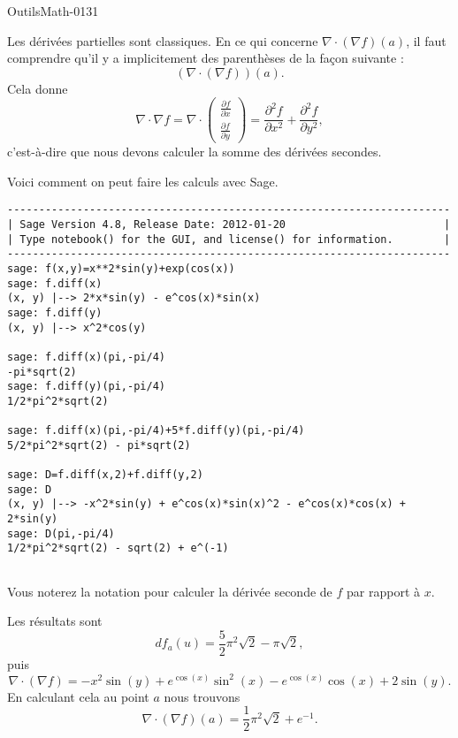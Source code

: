 
\begin{corrige}{OutilsMath-0131}

    Les dérivées partielles sont classiques. En ce qui concerne \( \nabla\cdot(\nabla f)(a)\), il faut comprendre qu'il y a implicitement des parenthèses de la façon suivante :
    \begin{equation}
        \left( \nabla\cdot (\nabla f) \right)(a).
    \end{equation}
    Cela donne
    \begin{equation}
        \nabla \cdot\nabla f=\nabla\cdot\begin{pmatrix}
            \frac{ \partial f }{ \partial x }    \\ 
            \frac{ \partial f }{ \partial y }    
        \end{pmatrix}=\frac{ \partial^2f }{ \partial x^2 }+\frac{ \partial^2f }{ \partial y^2 },
    \end{equation}
    c'est-à-dire que nous devons calculer la somme des dérivées secondes.

    Voici comment on peut faire les calculs avec Sage.
    \begin{verbatim}
----------------------------------------------------------------------
| Sage Version 4.8, Release Date: 2012-01-20                         |
| Type notebook() for the GUI, and license() for information.        |
----------------------------------------------------------------------
sage: f(x,y)=x**2*sin(y)+exp(cos(x))
sage: f.diff(x)
(x, y) |--> 2*x*sin(y) - e^cos(x)*sin(x)
sage: f.diff(y)
(x, y) |--> x^2*cos(y)

sage: f.diff(x)(pi,-pi/4)
-pi*sqrt(2)
sage: f.diff(y)(pi,-pi/4)
1/2*pi^2*sqrt(2)

sage: f.diff(x)(pi,-pi/4)+5*f.diff(y)(pi,-pi/4)
5/2*pi^2*sqrt(2) - pi*sqrt(2)

sage: D=f.diff(x,2)+f.diff(y,2)
sage: D
(x, y) |--> -x^2*sin(y) + e^cos(x)*sin(x)^2 - e^cos(x)*cos(x) + 2*sin(y)
sage: D(pi,-pi/4)
1/2*pi^2*sqrt(2) - sqrt(2) + e^(-1)
    
    \end{verbatim}

    Vous noterez la notation  pour calculer la dérivée seconde de \( f\) par rapport à \( x\).

    Les résultats sont
    \begin{equation}
        df_a(u)=\frac{ 5 }{ 2 }\pi^2\sqrt{2}-\pi\sqrt{2},
    \end{equation}
    puis
    \begin{equation}
        \nabla\cdot(\nabla f)=-x^2\sin(y)+ e^{\cos(x)}\sin^2(x)- e^{\cos(x)}\cos(x)+2\sin(y).
    \end{equation}
    En calculant cela au point \( a\) nous trouvons
    \begin{equation}
        \nabla\cdot(\nabla f)(a)=\frac{ 1 }{2}\pi^2\sqrt{2}+e^{-1}.
    \end{equation}

\end{corrige}
